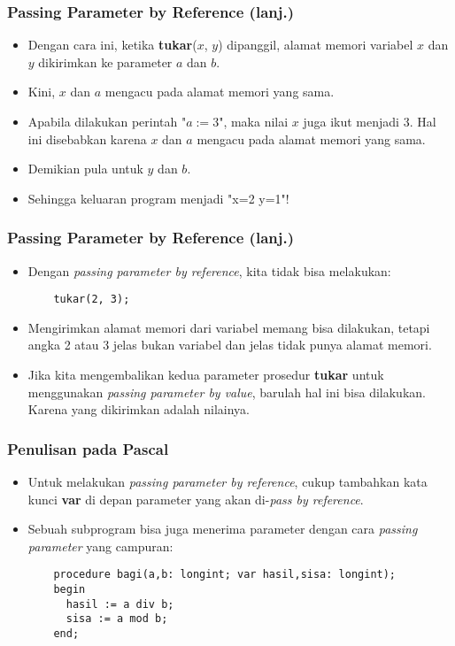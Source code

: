\begin{frame}[fragile]
\frametitle{Passing Parameter by Reference (lanj.)}
\begin{itemize}
  \item Dengan cara ini, ketika \textbf{tukar}($x$, $y$) dipanggil, \alert{alamat memori variabel} $x$ dan $y$ dikirimkan ke parameter $a$ dan $b$.
  \item Kini, $x$ dan $a$ mengacu pada alamat memori yang sama.
  \item Apabila dilakukan perintah "$a := 3$", maka nilai $x$ juga ikut menjadi 3. Hal ini disebabkan karena $x$ dan $a$ mengacu pada \alert{alamat memori yang sama}.
  \item Demikian pula untuk $y$ dan $b$.
  \item Sehingga keluaran program menjadi "x=2 y=1"!
\end{itemize}
\end{frame}

\begin{frame}[fragile]
\frametitle{Passing Parameter by Reference (lanj.)}
\begin{itemize}
  \item Dengan \textit{passing parameter by reference}, kita tidak bisa melakukan:
  \begin{lstlisting}
    tukar(2, 3);
  \end{lstlisting}

  \item Mengirimkan alamat memori dari variabel memang bisa dilakukan, tetapi angka 2 atau 3 jelas bukan variabel dan jelas \alert{tidak punya alamat memori}.
  \item Jika kita mengembalikan kedua parameter prosedur \textbf{tukar} untuk menggunakan \textit{passing parameter by value}, barulah hal ini bisa dilakukan. Karena yang dikirimkan adalah \alert{nilainya}.
\end{itemize}
\end{frame}

\begin{frame}[fragile]
\frametitle{Penulisan pada Pascal}
\begin{itemize}
  \item Untuk melakukan \textit{passing parameter by reference}, cukup tambahkan kata kunci \textbf{var} di depan parameter yang akan di-\textit{pass by reference}.
  \item Sebuah subprogram bisa juga menerima parameter dengan cara \textit{passing parameter} yang campuran:
  \begin{lstlisting}
    procedure bagi(a,b: longint; var hasil,sisa: longint);
    begin
      hasil := a div b;
      sisa := a mod b;
    end;
  \end{lstlisting}
\end{itemize}
\end{frame}


